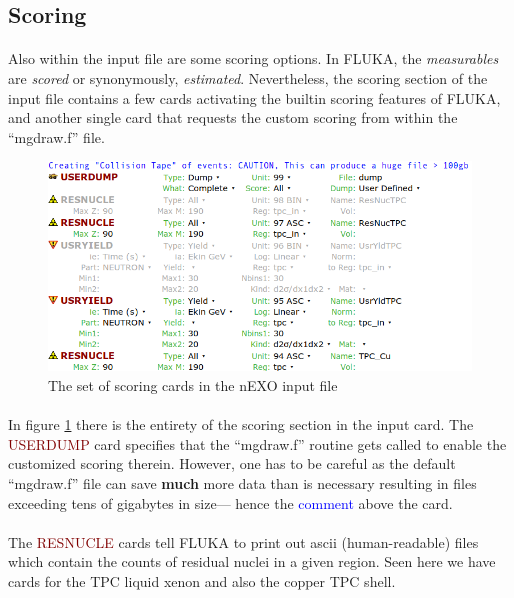 \subsection{Scoring}

\paragraph{}
Also within the input file are some scoring options. In FLUKA, the \textit{measurables} are \textit{scored} or synonymously, \textit{estimated}. Nevertheless, the scoring section of the input file contains a few cards activating the builtin scoring features of FLUKA, and another single card that requests the custom scoring from within the ``mgdraw.f'' file.

\begin{figure}[h]
    \begin{center}
    \includegraphics[scale=0.5]{figures/scoring.png}
    \caption{The set of scoring cards in the nEXO input file}
    \label{fig:scoring}
    \end{center}
\end{figure}

\paragraph{}
In figure \ref{fig:scoring} there is the entirety of the scoring section in the input card. The \textcolor{Maroon}{USERDUMP} card specifies that the ``mgdraw.f'' routine gets called to enable the customized scoring therein. However, one has to be careful as the default ``mgdraw.f'' file can save \textbf{much} more data than is necessary resulting in files exceeding tens of gigabytes in size— hence the \textcolor{Blue}{comment} above the card.

\paragraph{}
The \textcolor{Maroon}{RESNUCLE} cards tell FLUKA to print out ascii (human-readable) files which contain the counts of residual nuclei in a given region. Seen here we have cards for the TPC liquid xenon and also the copper TPC shell. 

